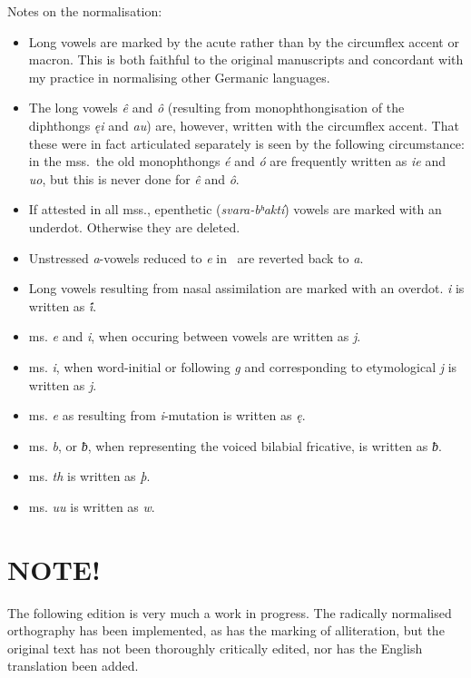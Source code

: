 Notes on the normalisation:
  \begin{itemize}
    \item Long vowels are marked by the acute rather than by the circumflex accent or macron. This is both faithful to the original manuscripts and concordant with my practice in normalising other Germanic languages.
    \item The long vowels \emph{ê} and \emph{ô} (resulting from monophthongisation of the diphthongs \emph{ęi} and \emph{au}) are, however, written with the circumflex accent.  That these were in fact articulated separately is seen by the following circumstance: in the mss.~the old monophthongs \emph{é} and \emph{ó} are frequently written as \emph{ie} and \emph{uo}, but this is never done for \emph{ê} and \emph{ô}.
    \item If attested in all mss., epenthetic (\emph{svara-bʰaktí}) vowels are marked with an underdot. Otherwise they are deleted.
    \item Unstressed \emph{a}-vowels reduced to \emph{e} in \CottonHeli\ are reverted back to \emph{a}.
    \item Long vowels resulting from nasal assimilation are marked with an overdot. \emph{i} is written as \emph{i̇́}.
    \item ms. \emph{e} and \emph{i}, when occuring between vowels are written as \emph{j}.
    \item ms. \emph{i}, when word-initial or following \emph{g} and corresponding to etymological \emph{j} is written as \emph{j}.
    \item ms. \emph{e} as resulting from \emph{i}-mutation is written as \emph{ę}.
    \item ms. \emph{b}, or \emph{ƀ}, when representing the voiced bilabial fricative, is written as \emph{ƀ}.
    \item ms. \emph{th} is written as \emph{þ}.
    \item ms. \emph{uu} is written as \emph{w}.
  \end{itemize}

\section{NOTE!}

The following edition is very much a work in progress.  The radically normalised orthography has been implemented, as has the marking of alliteration, but the original text has not been thoroughly critically edited, nor has the English translation been added.

